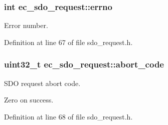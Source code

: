 \subsubsection[{errno}]{\setlength{\rightskip}{0pt plus 5cm}int {\bf ec\-\_\-sdo\-\_\-request\-::errno}}\label{structec__sdo__request_a1119ddcb79a3deed62e3890481109030}


\-Error number. 



\-Definition at line 67 of file sdo\-\_\-request.\-h.

\subsubsection[{abort\-\_\-code}]{\setlength{\rightskip}{0pt plus 5cm}uint32\-\_\-t {\bf ec\-\_\-sdo\-\_\-request\-::abort\-\_\-code}}\label{structec__sdo__request_aaa992ddb3f070824088161dffb347b3e}


\-S\-D\-O request abort code. 

\-Zero on success. 

\-Definition at line 68 of file sdo\-\_\-request.\-h.

